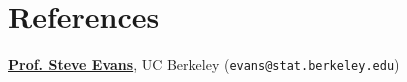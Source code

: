 \section{\sc References}

{\bf \href{https://www.stat.berkeley.edu/~evans/}{Prof. Steve Evans}}, UC Berkeley (\texttt{evans@stat.berkeley.edu})\\

\endinput